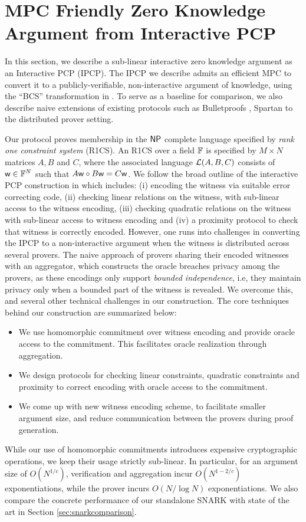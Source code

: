 \section{MPC Friendly Zero Knowledge Argument from Interactive PCP}
In this section, we describe a sub-linear interactive zero knowledge argument as
an Interactive PCP (IPCP). The IPCP we describe admits an efficient MPC to
convert it to a publicly-verifiable, non-interactive argument of knowledge,
using the ``BCS'' transformation in \cite{IOP2016}. To serve as a
baseline for comparison, we also describe naive extensions of existing protocols
such as Bulletproofs \cite{bulletproofs}, Spartan \cite{spartan} to the
distributed prover setting. 

Our protocol proves membership in the $\mathsf{NP}$ complete
language specified by {\em rank one constraint system} (R1CS). An R1CS over a
field $\mathbb{F}$ is specified by $M\times N$ matrices $A,B$ and $C$, where the
associated language $\mathcal{L}(A,B,C)$ consists of $\mathsf{w}\in \mathbb{F}^N$ such that
$A\mathsf{w}\circ B\mathsf{w}=C\mathsf{w}$. We follow the broad outline of the interactive PCP
construction in \cite{ligero} which includes: (i) encoding the witness via suitable
error correcting code, (ii) checking linear relations on the witness, with
sub-linear access to the witness encoding, (iii) checking quadratic relations on
the witness with sub-linear access to witness encoding and (iv) a proximity
protocol to check that witness is correctly encoded. However, one runs into 
challenges in converting the IPCP to a non-interactive
argument when the witness is distributed across several provers. The naive
approach of provers sharing their encoded witnesses with an aggregator, which
constructs the oracle breaches privacy among the provers, as these encodings
only support {\em bounded independence}, i.e, they maintain privacy only when a
bounded part of the witness is revealed. We overcome this, and several other
technical challenges in our construction. The core techniques behind our
construction are summarized below:
\begin{itemize}
\item We use homomorphic commitment over witness encoding and provide oracle
access to the commitment. This facilitates oracle realization through
aggregation.
\item We design protocols for checking linear constraints, quadratic constraints
and proximity to correct encoding with oracle access to the commitment.
\item We come up with new witness encoding scheme, to facilitate smaller
argument size, and reduce communication between the provers during proof
generation.
\end{itemize}
While our use of homomorphic commitments introduces expensive cryptographic
operations, we keep their usage strictly sub-linear. In particular, for an
argument size of $O(N^{1/c})$, verification and aggregation incur $O(N^{1-2/c})$
exponentiations, while the prover incurs $O(N/\log N)$ exponentiations. We also
compare the concrete performance of our standalone SNARK with state of the art in Section
\ref{sec:snarkcomparison}.
